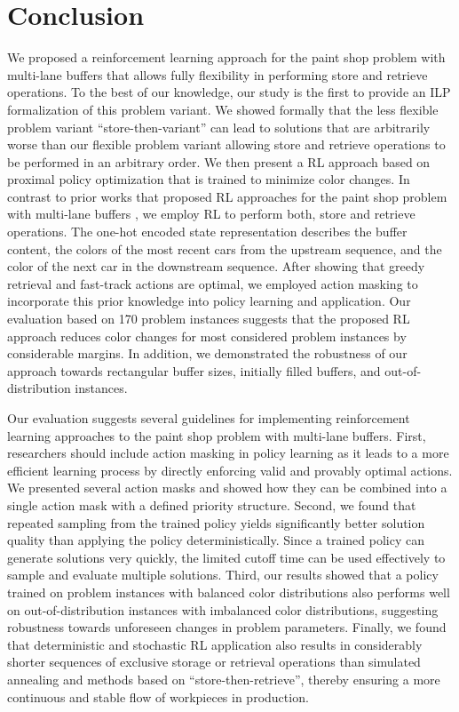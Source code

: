 \documentclass[11pt]{elsarticle}
\begin{document}
\section{Conclusion}
\label{section-Conclusion}


We proposed a reinforcement learning approach for the paint shop problem with multi-lane buffers that allows fully flexibility in performing store and retrieve operations. To the best of our knowledge, our study is the first to provide an ILP formalization of this problem variant. We showed formally that the less flexible problem variant ``store-then-variant'' can lead to solutions that are arbitrarily worse than our flexible problem variant allowing store and retrieve operations to be performed in an arbitrary order. We then present a RL approach based on proximal policy optimization that is trained to minimize color changes. In contrast to prior works that proposed RL approaches for the paint shop problem with multi-lane buffers \citep{Huang.2024,Leng.2020,Leng.2023}, we employ RL to perform both, store and retrieve operations. 
The one-hot encoded state representation describes the buffer content, the colors of the most recent cars from the upstream sequence, and the color of the next car in the downstream sequence. After showing that greedy retrieval and fast-track actions are optimal, we employed action masking to incorporate this prior knowledge into policy learning and application. Our evaluation based on 170 problem instances suggests that the proposed RL approach reduces color changes for most considered problem instances by considerable margins. In addition, we demonstrated the robustness of our approach towards rectangular buffer sizes, initially filled buffers, and out-of-distribution instances.



Our evaluation suggests several guidelines for implementing reinforcement learning approaches to the paint shop problem with multi-lane buffers. First, researchers should include action masking in policy learning as it leads to a more efficient learning process by directly enforcing valid and provably optimal actions. We presented several action masks and showed how they can be combined into a single action mask with a defined priority structure. 
Second, we found that repeated sampling from the trained policy yields significantly better solution quality than applying the policy deterministically. Since a trained policy can generate solutions very quickly, the limited cutoff time can be used effectively to sample and evaluate multiple solutions.
Third, our results showed that a policy trained on problem instances with balanced color distributions also performs well on out-of-distribution instances with imbalanced color distributions, suggesting robustness towards unforeseen changes in problem parameters. Finally, we found that deterministic and stochastic RL application also results in considerably shorter  sequences of exclusive storage or retrieval operations than simulated annealing and methods based on ``store-then-retrieve'', thereby ensuring a more continuous and stable flow of workpieces in production.
\end{document}
